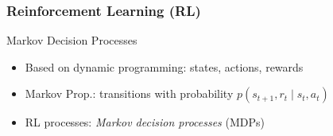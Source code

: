 \documentclass[xcolor=table%
,t]{beamer}
\begin{document}
\begin{frame}[t]
  \frametitle{Reinforcement Learning (RL)}

  \begin{block}{Markov Decision Processes~\footnotemark}
    \centering
    


    \begin{itemize}
      \item Based on dynamic programming: states, actions, rewards
      \item Markov Prop.: transitions with probability \(p(s_{t+1}, r_{t} \mid s_{t}, a_{t})\) 
      \item RL processes: \textit{Markov decision processes} (MDPs)
    \end{itemize}

\end{block}
\end{frame}
\end{document}
